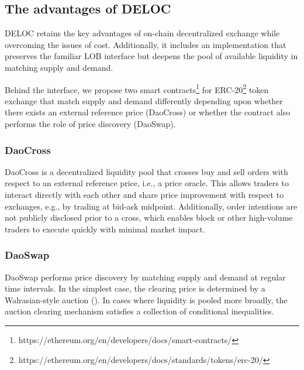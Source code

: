 \documentclass[11pt, reqno]{amsart}
\theoremstyle{definition}
\theoremstyle{remark}
\begin{document}
\subsection{The advantages of DELOC}

DELOC retains the key advantages of on-chain decentralized exchange while
overcoming the issues of cost. Additionally, it includes an implementation
that preserves the familiar LOB interface but deepens the pool of available
liquidity in matching supply and demand.

Behind the interface, we propose two smart
contracts\footnote{https://ethereum.org/en/developers/docs/smart-contracts/}
for
ERC-20\footnote{https://ethereum.org/en/developers/docs/standards/tokens/erc-20/}
token exchange that match supply and demand differently depending upon whether
there exists an external reference price (DaoCross) or whether the contract
also performs the role of price discovery (DaoSwap).

\subsubsection{DaoCross}
DaoCross is a decentralized liquidity pool that crosses buy and sell orders
with respect to an external reference price, i.e., a price oracle. This allows
traders to interact directly with each other and share price improvement with
respect to exchanges, e.g., by trading at bid-ask midpoint. Additionally, order
intentions are not publicly disclosed prior to a cross, which enables block or
other high-volume traders to execute quickly with minimal market impact.

\subsubsection{DaoSwap}
DaoSwap performs price discovery by matching supply and demand at regular time
intervals. In the simplest case, the clearing price is determined by a
Walrasian-style auction (\cite{Wa}). In cases where liquidity is pooled more
broadly, the auction clearing mechanism satisfies a collection of conditional
inequalities.
\end{document}
